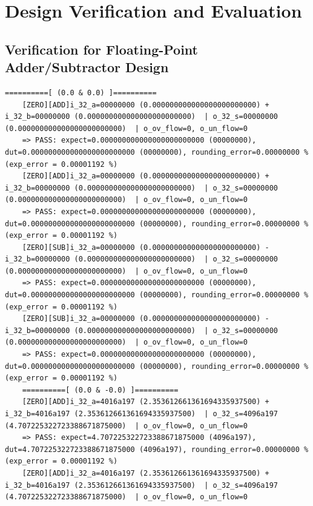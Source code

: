 \section{Design Verification and Evaluation}

\subsection{Verification for Floating-Point Adder/Subtractor Design}

\begin{lstlisting}[style=StyleResult, basicstyle=\fontsize{6}{7}\selectfont\ttfamily ,language=Result, caption={Kết quả test của bộ cộng trừ FPU.}]
	==========[ (0.0 & 0.0) ]==========
	[ZERO][ADD]i_32_a=00000000 (0.000000000000000000000000) + i_32_b=00000000 (0.000000000000000000000000) 	| o_32_s=00000000 (0.000000000000000000000000) 	| o_ov_flow=0, o_un_flow=0
	=> PASS: expect=0.000000000000000000000000 (00000000), dut=0.000000000000000000000000 (00000000), rounding_error=0.00000000 % (exp_error = 0.00001192 %)
	[ZERO][ADD]i_32_a=00000000 (0.000000000000000000000000) + i_32_b=00000000 (0.000000000000000000000000) 	| o_32_s=00000000 (0.000000000000000000000000) 	| o_ov_flow=0, o_un_flow=0
	=> PASS: expect=0.000000000000000000000000 (00000000), dut=0.000000000000000000000000 (00000000), rounding_error=0.00000000 % (exp_error = 0.00001192 %)
	[ZERO][SUB]i_32_a=00000000 (0.000000000000000000000000) - i_32_b=00000000 (0.000000000000000000000000) 	| o_32_s=00000000 (0.000000000000000000000000) 	| o_ov_flow=0, o_un_flow=0
	=> PASS: expect=0.000000000000000000000000 (00000000), dut=0.000000000000000000000000 (00000000), rounding_error=0.00000000 % (exp_error = 0.00001192 %)
	[ZERO][SUB]i_32_a=00000000 (0.000000000000000000000000) - i_32_b=00000000 (0.000000000000000000000000) 	| o_32_s=00000000 (0.000000000000000000000000) 	| o_ov_flow=0, o_un_flow=0
	=> PASS: expect=0.000000000000000000000000 (00000000), dut=0.000000000000000000000000 (00000000), rounding_error=0.00000000 % (exp_error = 0.00001192 %)
	==========[ (0.0 & -0.0) ]==========
	[ZERO][ADD]i_32_a=4016a197 (2.353612661361694335937500) + i_32_b=4016a197 (2.353612661361694335937500) 	| o_32_s=4096a197 (4.707225322723388671875000) 	| o_ov_flow=0, o_un_flow=0
	=> PASS: expect=4.707225322723388671875000 (4096a197), dut=4.707225322723388671875000 (4096a197), rounding_error=0.00000000 % (exp_error = 0.00001192 %)
	[ZERO][ADD]i_32_a=4016a197 (2.353612661361694335937500) + i_32_b=4016a197 (2.353612661361694335937500) 	| o_32_s=4096a197 (4.707225322723388671875000) 	| o_ov_flow=0, o_un_flow=0

\end{lstlisting}
